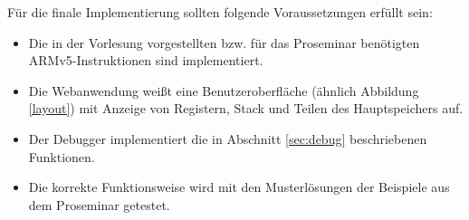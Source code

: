 \documentclass[a4paper, 11pt, onecolumn]{article}
\begin{document}
Für die finale Implementierung sollten folgende Voraussetzungen erfüllt sein:

\begin{itemize}
\item Die in der Vorlesung vorgestellten bzw. für das Proseminar benötigten ARMv5-Instruktionen sind implementiert.
\item Die Webanwendung weißt eine Benutzeroberfläche (ähnlich Abbildung \ref{layout}) mit Anzeige von Registern, Stack und Teilen des Hauptspeichers auf.
\item Der Debugger implementiert die in Abschnitt \ref{sec:debug} beschriebenen Funktionen.
\item Die korrekte Funktionsweise wird mit den Musterlösungen der Beispiele aus dem Proseminar getestet.
\end{itemize}




\end{document}
